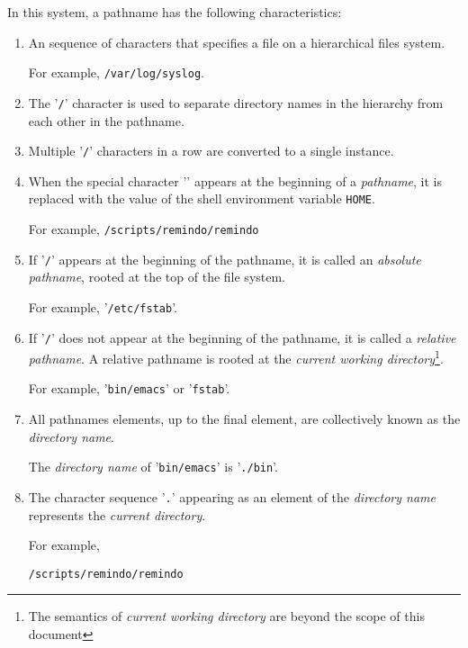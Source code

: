 In this system, a pathname has the following characteristics:
\begin{enumerate}

  \item An \asciiz sequence of characters that specifies a file on a
    hierarchical files system.

    For example, \texttt{/var/log/syslog}.

  \item The '\texttt{/}' character is used to separate directory names
    in the hierarchy from each other in the pathname.

  \item Multiple '\texttt{/}' characters in a row are converted to a
    single instance.

  \item When the special character '\TILDE' appears at the beginning
    of a \emph{pathname}, it is replaced with the value of the shell
    environment variable \texttt{HOME}.

    For example, \texttt{\TILDE/scripts/remindo/remindo}

  \item If '\texttt{/}' appears at the beginning of the pathname, it
    is called an \emph{absolute pathname}, rooted at the top of the
    file system.

    For example, '\texttt{/etc/fstab}'.

  \item If '\texttt{/}' does not appear at the beginning of the
    pathname, it is called a \emph{relative pathname}.  A relative
    pathname is rooted at the \emph{current working
      directory}\footnote{The semantics of \emph{current working
        directory} are beyond the scope of this document}.

    For example, '\texttt{bin/emacs}' or '\texttt{fstab}'.

  \item All pathnames elements, up to the final element, are
    collectively known as the \emph{directory name}.

    The \emph{directory name} of '\texttt{bin/emacs}' is
    '\texttt{./bin}'.

  \item The character sequence '\texttt{.}' appearing as an element of
    the \emph{directory name} represents the \emph{current directory}.

    For example,

    \texttt{\TILDE/scripts/remindo/remindo}


\end{enumerate}

